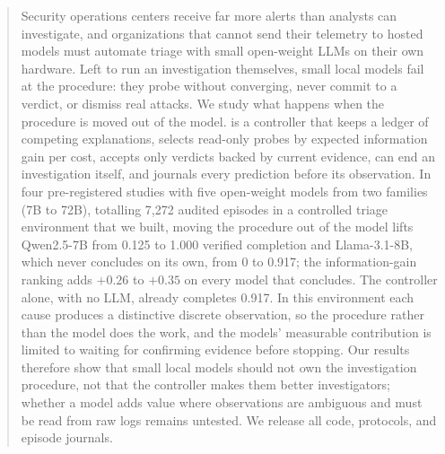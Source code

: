 \begin{abstract}
Security operations centers receive far more alerts than analysts can investigate, and organizations that cannot send their telemetry to hosted models must automate triage with small open-weight LLMs on their own hardware. Left to run an investigation themselves, small local models fail at the procedure: they probe without converging, never commit to a verdict, or dismiss real attacks. We study what happens when the procedure is moved out of the model. \hesp{} is a controller that keeps a ledger of competing explanations, selects read-only probes by expected information gain per cost, accepts only verdicts backed by current evidence, can end an investigation itself, and journals every prediction before its observation. In four pre-registered studies with five open-weight models from two families (7B to 72B), totalling 7{,}272 audited episodes in a controlled triage environment that we built, moving the procedure out of the model lifts Qwen2.5-7B from 0.125 to 1.000 verified completion and Llama-3.1-8B, which never concludes on its own, from 0 to 0.917; the information-gain ranking adds $+0.26$ to $+0.35$ on every model that concludes. The controller alone, with no LLM, already completes 0.917. In this environment each cause produces a distinctive discrete observation, so the procedure rather than the model does the work, and the models' measurable contribution is limited to waiting for confirming evidence before stopping. Our results therefore show that small local models should not own the investigation procedure, not that the controller makes them better investigators; whether a model adds value where observations are ambiguous and must be read from raw logs remains untested. We release all code, protocols, and episode journals.
\end{abstract}
